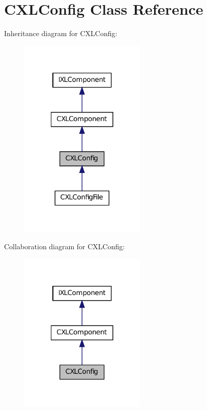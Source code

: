 \hypertarget{classCXLConfig}{
\section{CXLConfig Class Reference}
\label{classCXLConfig}
}


Inheritance diagram for CXLConfig:\nopagebreak
\begin{figure}[H]
\begin{center}
\leavevmode
\includegraphics[width=170pt]{classCXLConfig__inherit__graph}
\end{center}
\end{figure}


Collaboration diagram for CXLConfig:\nopagebreak
\begin{figure}[H]
\begin{center}
\leavevmode
\includegraphics[width=170pt]{classCXLConfig__coll__graph}
\end{center}
\end{figure}

